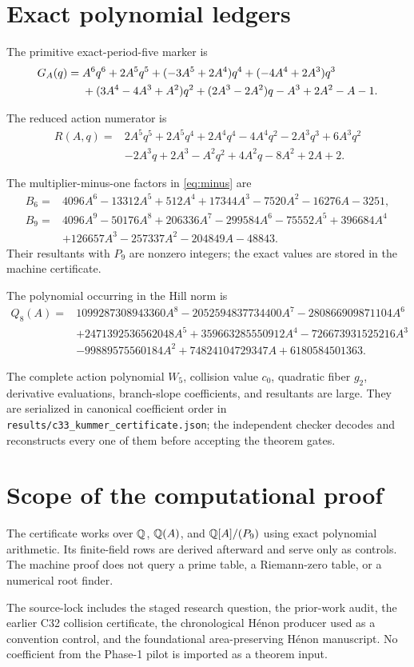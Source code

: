 \section{Exact polynomial ledgers}\label{app:ledgers}

The primitive exact-period-five marker is
\begin{align*}
G_A(q)={}&A^6q^6+2A^5q^5+(-3A^5+2A^4)q^4
+(-4A^4+2A^3)q^3\\
&+(3A^4-4A^3+A^2)q^2+(2A^3-2A^2)q
-A^3+2A^2-A-1.
\end{align*}

The reduced action numerator is
\begin{align*}
R(A,q)={}&2A^5q^5+2A^5q^4+2A^4q^4-4A^4q^2
-2A^3q^3+6A^3q^2\\
&-2A^3q+2A^3-A^2q^2+4A^2q-8A^2+2A+2.
\end{align*}

The multiplier-minus-one factors in \eqref{eq:minus} are
\begin{align*}
B_6={}&4096A^6-13312A^5+512A^4+17344A^3
-7520A^2-16276A-3251,\\
B_9={}&4096A^9-50176A^8+206336A^7-299584A^6
-75552A^5+396684A^4\\
&+126657A^3-257337A^2-204849A-48843.
\end{align*}
Their resultants with \(P_9\) are nonzero integers; the exact values are
stored in the machine certificate.

The polynomial occurring in the Hill norm is
\begin{align*}
Q_8(A)={}&1099287308943360A^8-2052594837734400A^7
-280866909871104A^6\\
&+2471392536562048A^5+359663285550912A^4
-726673931525216A^3\\
&-99889575560184A^2+74824104729347A+6180584501363.
\end{align*}

The complete action polynomial \(W_5\), collision value \(c_0\), quadratic
fiber \(g_2\), derivative evaluations, branch-slope coefficients, and
resultants are large.  They are serialized in canonical coefficient order
in \texttt{results/c33\_kummer\_certificate.json}; the independent checker decodes
and reconstructs every one of them before accepting the theorem gates.

\section{Scope of the computational proof}

The certificate works over \(\mathbb{Q}\), \(\mathbb{Q}(A)\), and
\(\mathbb{Q}[A]/(P_9)\) using exact polynomial arithmetic.  Its finite-field rows
are derived afterward and serve only as controls.  The machine proof does
not query a prime table, a Riemann-zero table, or a numerical root finder.

The source-lock includes the staged research question, the prior-work audit,
the earlier C32 collision certificate, the chronological H\'enon producer
used as a convention control, and the foundational area-preserving H\'enon
manuscript.  No coefficient from the Phase-1 pilot is imported as a theorem
input.
